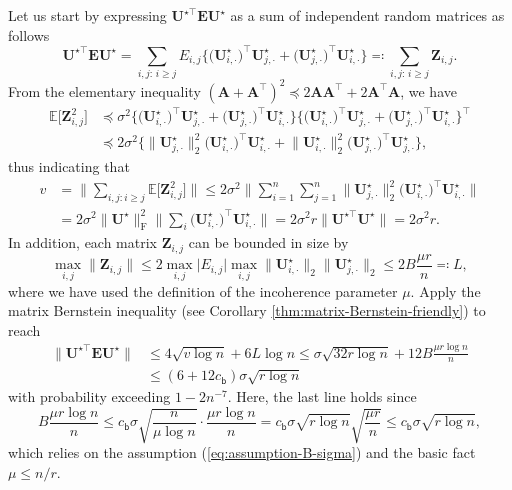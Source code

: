Let us start by expressing $\bm{U}^{\star\top}\bm{E}\bm{U}^{\star}$
as a sum of independent random matrices as follows
%
\[
\bm{U}^{\star\top}\bm{E}\bm{U}^{\star}=\sum_{i,j:\,i\geq j}E_{i,j}\Big\{\big(\bm{U}_{i,\cdot}^{\star}\big)^{\top}\bm{U}_{j,\cdot}^{\star}+\big(\bm{U}_{j,\cdot}^{\star}\big)^{\top}\bm{U}_{i,\cdot}^{\star}\Big\}\eqqcolon\sum_{i,j:\,i\geq j}\bm{Z}_{i,j}.
\]
%
From the elementary inequality $(\bm{A}+\bm{A}^{\top})^{2}\preceq2\bm{A}\bm{A}^{\top}+2\bm{A}^{\top}\bm{A}$, we have
%
\begin{align*}
\mathbb{E}\big[\bm{Z}_{i,j}^{2}\big] & \preceq\sigma^{2}\Big\{\big(\bm{U}_{i,\cdot}^{\star}\big)^{\top}\bm{U}_{j,\cdot}^{\star}+\big(\bm{U}_{j,\cdot}^{\star}\big)^{\top}\bm{U}_{i,\cdot}^{\star}\Big\}\Big\{\big(\bm{U}_{i,\cdot}^{\star}\big)^{\top}\bm{U}_{j,\cdot}^{\star}+\big(\bm{U}_{j,\cdot}^{\star}\big)^{\top}\bm{U}_{i,\cdot}^{\star}\Big\}^{\top}\\
 & \preceq2\sigma^{2}\Big\{\big\|\bm{U}_{j,\cdot}^{\star}\big\|_{2}^{2}\big(\bm{U}_{i,\cdot}^{\star}\big)^{\top}\bm{U}_{i,\cdot}^{\star}+\big\|\bm{U}_{i,\cdot}^{\star}\big\|_{2}^{2}\big(\bm{U}_{j,\cdot}^{\star}\big)^{\top}\bm{U}_{j,\cdot}^{\star}\Big\},
\end{align*}
%
thus indicating that
%
\begin{align*}
v & =\Big\|\sum_{i,j:i\geq j}\mathbb{E}\big[\bm{Z}_{i,j}^{2}\big]\Big\|\leq2\sigma^{2}\Big\|\sum_{i=1}^{n}\sum_{j=1}^{n}\big\|\bm{U}_{j,\cdot}^{\star}\big\|_{2}^{2}\big(\bm{U}_{i,\cdot}^{\star}\big)^{\top}\bm{U}_{i,\cdot}^{\star}\Big\|\\
 & =2\sigma^{2}\|\bm{U}^{\star}\|_{\mathrm{F}}^{2}\Big\|\sum_{i}\big(\bm{U}_{i,\cdot}^{\star}\big)^{\top}\bm{U}_{i,\cdot}^{\star}\Big\|
	=2\sigma^{2}r \big\|\bm{U}^{\star\top}\bm{U}^{\star}\big\| =2\sigma^{2}r.
\end{align*}
%
In addition, each matrix $\bm{Z}_{i,j}$ can be bounded in size by
%
\[
\max_{i,j}\|\bm{Z}_{i,j}\|\leq2\max_{i,j}\big|E_{i,j}\big|\max_{i,j}\big\|\bm{U}_{i,\cdot}^{\star}\big\|_{2}\big\|\bm{U}_{j,\cdot}^{\star}\big\|_{2}\leq2B\frac{\mu r}{n}\eqqcolon L,
\]
%
where we have used the definition of the incoherence parameter $\mu$.
Apply the matrix Bernstein inequality (see Corollary \ref{thm:matrix-Bernstein-friendly}) to reach
%
\begin{align*}
\big\|\bm{U}^{\star\top}\bm{E}\bm{U}^{\star}\big\| & \leq4\sqrt{v\log n}+6L\log n\leq\sigma\sqrt{32r\log n}+ 12B\frac{\mu r\log n}{n}\\
 & \leq(6+ 12c_{\mathsf{b}})\sigma\sqrt{r\log n}
\end{align*}
%
with probability exceeding $1-2n^{-7}.$ Here, the last line holds since
%
\[
B\frac{\mu r\log n}{n}\leq c_{\mathsf{b}}\sigma\sqrt{\frac{n}{\mu\log n}}\cdot\frac{\mu r\log n}{n}=c_{\mathsf{b}}\sigma\sqrt{r\log n}\sqrt{\frac{\mu r}{n}}\leq c_{\mathsf{b}}\sigma\sqrt{r\log n},
\]
%
which relies on the assumption (\ref{eq:assumption-B-sigma}) and the basic fact $\mu\leq n/r$.
%



